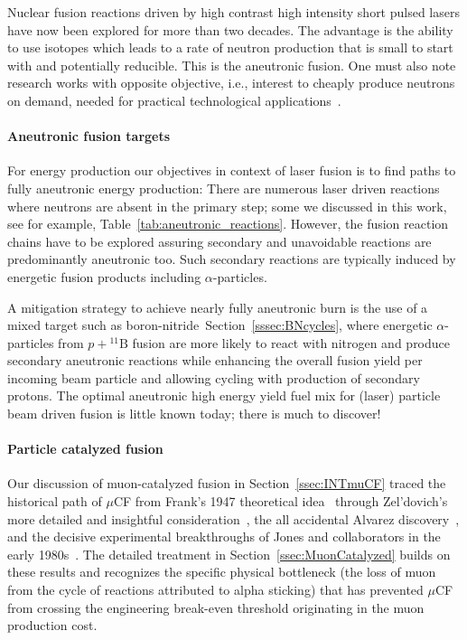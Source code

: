 \documentclass[particles,article,accept,pdftex,moreauthors]{Definitions/mdpi}
\newcommand{\rsec}[1]{Section~\ref{#1}}
\begin{document}
Nuclear fusion reactions driven by high contrast high intensity short pulsed lasers have now been explored for more than two decades. The advantage is the ability to use isotopes which leads to a rate of neutron production that is small to start with and potentially reducible. This is the aneutronic fusion. One must also note research works with opposite objective, i.e., interest to cheaply produce neutrons on demand, needed for practical technological applications~\cite{Karsch2002Neutrons}.


\paragraph*{\bf Aneutronic fusion targets}
For energy production our objectives in context of laser fusion is to find paths to fully aneutronic energy production: There are numerous laser driven reactions where neutrons are absent in the primary step; some we discussed in this work, see for example, Table~\ref{tab:aneutronic_reactions}. However, the fusion reaction chains have to be explored assuring secondary and unavoidable reactions are predominantly aneutronic too. Such secondary reactions are typically induced by energetic fusion products including $\alpha$-particles.

A mitigation strategy to achieve nearly fully aneutronic burn is the use of a mixed target such as boron-nitride~\rsec{sssec:BNcycles}, where energetic $\alpha$-particles from $p+{}^{11}\mathrm{B}$ fusion are more likely to react with nitrogen and produce secondary aneutronic reactions while enhancing the overall fusion yield per incoming beam particle and allowing cycling with production of secondary protons. The optimal aneutronic high energy yield fuel mix for (laser) particle beam driven fusion is little known today; there is much to discover!

\paragraph*{\bf Particle catalyzed fusion}
Our discussion of muon-catalyzed fusion in \rsec{ssec:INTmuCF} traced the historical path of $\mu$CF from Frank's 1947 theoretical idea~\cite{Frank:1947} through Zel'dovich's more detailed and insightful consideration~\cite{Zel:1954}, the all accidental Alvarez discovery~\cite{Alvarez:1957un}, and the decisive experimental breakthroughs of Jones and collaborators in the early 1980s~\cite{Jones:1983pw,Jones:1986kk,Jones:1986Na}. The detailed treatment in Section~\ref{ssec:MuonCatalyzed} builds on these results and recognizes the specific physical bottleneck (the loss of muon from the cycle of reactions attributed to alpha sticking) that has prevented $\mu$CF from crossing the engineering break-even threshold originating in the muon production cost.
\end{document}
